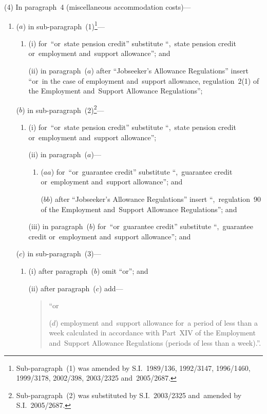 \documentclass[12pt,a4paper]{article}
\begin{document}
(4) In paragraph~4 (miscellaneous accommodation costs)—
\begin{enumerate}\item[]
($a$) in sub-paragraph~(1)\footnote{Sub-paragraph~(1) was amended by S.I.~1989/136, 1992/3147, 1996/1460, 1999/3178, 2002/398, 2003/2325 and~2005/2687.}—
\begin{enumerate}\item[]
(i) for~“or~state pension credit” substitute “,~state pension credit or~employment and~support allowance”; and

(ii) in paragraph~($a$)  after “Jobseeker’s Allowance Regulations” insert “or~in the case of employment and~support allowance, regulation~2(1) of the Employment and~Support Allowance Regulations”;
\end{enumerate}

($b$) in sub-paragraph~(2)\footnote{Sub-paragraph~(2) was substituted by S.I.~2003/2325 and~amended by S.I.~2005/2687.}—
\begin{enumerate}\item[]
(i) for~“or~state pension credit” substitute “,~state pension credit or~employment and~support allowance”;

(ii) in paragraph~($a$)—
\begin{enumerate}\item[]
($aa$) for~“or~guarantee credit” substitute “,~guarantee credit or~employment and~support allowance”; and

($bb$) after “Jobseeker’s Allowance Regulations” insert “,~regulation~90 of the Employment and~Support Allowance Regulations”; and
\end{enumerate}

(iii) in paragraph~($b$)  for~“or~guarantee credit” substitute “,~guarantee credit or~employment and~support allowance”; and
\end{enumerate}

($c$) in sub-paragraph~(3)—
\begin{enumerate}\item[]
(i) after paragraph~($b$)  omit “or”; and

(ii) after paragraph~($c$)  add—
\begin{quotation}
“or

($d$) employment and~support allowance for~a period of less than a week calculated in accordance with Part~XIV of the Employment and~Support Allowance Regulations (periods of less than a week).”.
\end{quotation}
\end{enumerate}
\end{enumerate}
\end{document}
